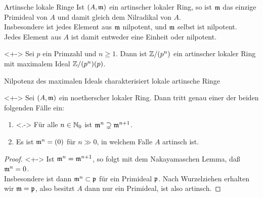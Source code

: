 \begin{frame}{Artinsche lokale Ringe}
	Ist \((A, \mathfrak{m})\) ein artinscher lokaler Ring, so ist \(\mathfrak{m}\)
	das einzige Primideal von \(A\) und damit gleich dem Nilradikal von \(A\).
	\\
	Insbesondere ist jedes Element aus \(\mathfrak{m}\) nilpotent, und \(\mathfrak{m}\)
	selbst ist nilpotent.
	\\
	Jedes Element aus \(A\) ist damit entweder eine Einheit oder nilpotent.
	\begin{example}<+->
		Sei \(p\) ein Primzahl und \(n \ge 1\). Dann ist \(\mathbb Z/(p^n)\) ein
		artinscher lokaler Ring mit maximalem Ideal \(\mathbb Z/(p^n) (p)\).
	\end{example}
\end{frame}

\begin{frame}{Nilpotenz des maximalen Ideals charakterisiert lokale artinsche Ringe}
	\begin{proposition}<+->
		Sei \((A, \mathfrak{m})\) ein noetherscher lokaler Ring. Dann tritt genau
		einer der beiden folgenden Fälle ein:
		\begin{enumerate}[<+->]
		\item<.->
			Für alle \(n \in \mathbb N_0\) ist \(\mathfrak{m}^n \supsetneq
			\mathfrak{m}^{n + 1}\).
		\item
			Es ist \(\mathfrak{m}^n = (0)\) für \(n \gg 0\), in welchem Falle
			\(A\) artinsch ist.
		\end{enumerate}
	\end{proposition}
	\begin{proof}<+->
		Ist \(\mathfrak{m}^n = \mathfrak{m}^{n + 1}\), so folgt mit dem
		Nakayamaschen Lemma, daß \(\mathfrak{m}^n = 0\).
		\\
		Insbesondere ist dann
		\(\mathfrak{m}^n \subset \mathfrak{p}\) für ein Primideal \(\mathfrak{p}\). Nach
		Wurzelziehen erhalten wir \(\mathfrak{m} = \mathfrak{p}\), also besitzt \(A\)
		dann nur ein Primideal, ist also artinsch.
	\end{proof}
\end{frame}

